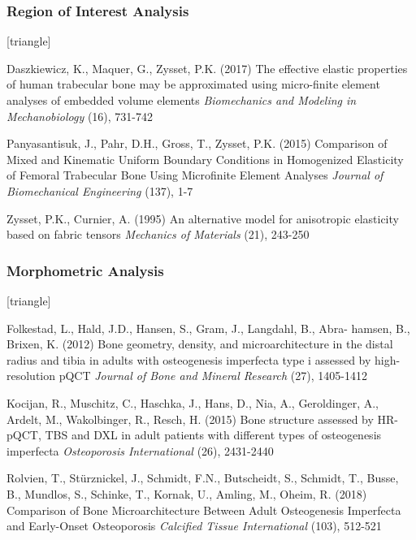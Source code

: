 \documentclass[xcolor=table,11pt]{beamer}
\begin{document}
\begin{frame}
	\frametitle{Region of Interest Analysis}
	\footnotesize{
		\begin{thebibliography}{99}
			[triangle]
			
			 Daszkiewicz, K., Maquer, G., Zysset, P.K. (2017)
			\newblock The effective elastic properties of human trabecular bone may be approximated using micro-finite element analyses of embedded volume elements
			\newblock \textit{Biomechanics and Modeling in Mechanobiology} (16), 731-742
			
			 Panyasantisuk, J., Pahr, D.H., Gross, T., Zysset, P.K. (2015)
			\newblock Comparison of Mixed and Kinematic Uniform Boundary Conditions in Homogenized Elasticity of Femoral Trabecular Bone Using Microfinite Element Analyses
			\newblock \textit{Journal of Biomechanical Engineering} (137), 1-7
			
			  Zysset, P.K., Curnier, A. (1995)
			\newblock An alternative model for anisotropic
			elasticity based on fabric tensors
			\newblock \textit{Mechanics of Materials} (21), 243-250
			
		\end{thebibliography}
	}
\end{frame}



\begin{frame}
	\frametitle{Morphometric Analysis}
	\footnotesize{
		\begin{thebibliography}{99}
			[triangle]
			
			 Folkestad, L., Hald, J.D., Hansen, S., Gram, J., Langdahl, B., Abra-
			hamsen, B., Brixen, K. (2012)
			\newblock Bone geometry, density, and microarchitecture in the distal radius and tibia in adults with osteogenesis imperfecta type i assessed by high-resolution pQCT
			\newblock \textit{Journal of Bone and Mineral Research} (27), 1405-1412
			
			 Kocijan, R., Muschitz, C., Haschka, J., Hans, D., Nia, A., Geroldinger, A., Ardelt, M., Wakolbinger, R., Resch, H. (2015)
			\newblock Bone structure assessed by HR-pQCT, TBS and DXL in adult patients with different types of osteogenesis imperfecta
			\newblock \textit{Osteoporosis International
			} (26), 2431-2440
			
			 Rolvien, T., Stürznickel, J., Schmidt, F.N., Butscheidt, S., Schmidt, T., Busse, B., Mundlos, S., Schinke, T., Kornak, U., Amling, M., Oheim, R. (2018)
			\newblock Comparison of Bone Microarchitecture Between
			Adult Osteogenesis Imperfecta and Early-Onset Osteoporosis
			\newblock \textit{Calcified Tissue International} (103), 512-521
			
		\end{thebibliography}
	}
\end{frame}
\end{document}
